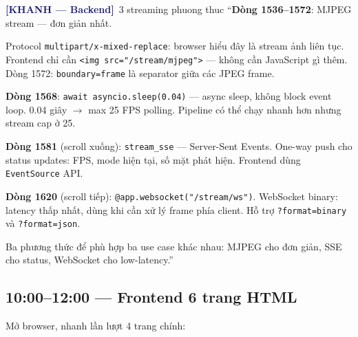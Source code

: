 \documentclass[12pt, a4paper]{article}
\newcommand{\khanh}{\textcolor{MidnightBlue}{\textbf{[KHANH --- Backend]}}}
\begin{document}
\begin{dialog}{\khanh\ 3 streaming phuong thuc}
``\textbf{Dòng 1536--1572}: MJPEG stream --- đơn giản nhất.

Protocol \texttt{multipart/x-mixed-replace}: browser hiểu đây là stream ảnh liên tục.
Frontend chỉ cần \texttt{<img src="/stream/mjpeg">} --- không cần JavaScript gì thêm.
Dòng 1572: \texttt{boundary=frame} là separator giữa các JPEG frame.

\textbf{Dòng 1568}: \texttt{await asyncio.sleep(0.04)} --- async sleep, không block event loop.
0.04 giây $\to$ max 25 FPS polling. Pipeline có thể chạy nhanh hơn nhưng stream cap ở 25.

\textbf{Dòng 1581} (scroll xuống): \texttt{stream\_sse} --- Server-Sent Events.
One-way push cho status updates: FPS, mode hiện tại, số mặt phát hiện.
Frontend dùng \texttt{EventSource} API.

\textbf{Dòng 1620} (scroll tiếp): \texttt{@app.websocket("/stream/ws")}.
WebSocket binary: latency thấp nhất, dùng khi cần xử lý frame phía client.
Hỗ trợ \texttt{?format=binary} và \texttt{?format=json}.

Ba phương thức để phù hợp ba use case khác nhau:
MJPEG cho đơn giản, SSE cho status, WebSocket cho low-latency.''
\end{dialog}

\subsection{10:00--12:00 --- Frontend 6 trang HTML}

\begin{action}
Mở browser, nhanh lần lượt 4 trang chính:
\end{action}
\end{document}
